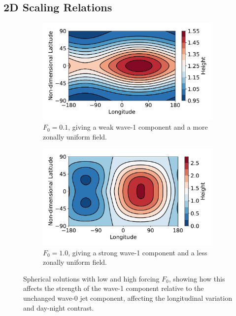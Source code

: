 \subsection{2D Scaling Relations}\label{sec:2d-scaling}


\begin{figure}
  \centering
  \begin{subfigure}[t]{0.48\textwidth}
    \includegraphics[width=\textwidth]{figures/wave-mean-flow/spherical-low-F.pdf}
    \caption{$F_{0} = 0.1$, giving a weak wave-1 component and  a more zonally uniform field.}
    \label{fig:spherical-low-F}
  \end{subfigure}
  \quad
  \begin{subfigure}[t]{0.48\textwidth}
    \includegraphics[width=\textwidth]{figures/wave-mean-flow/spherical-high-F.pdf}
    \caption{$F_{0} = 1.0$, giving a strong wave-1 component and a less zonally uniform field.}
    \label{fig:spherical-high-F}
  \end{subfigure}
  \caption{Spherical solutions with low and high forcing $F_{0}$, showing how this affects the strength of the wave-1 component relative to the unchanged wave-0 jet component, affecting the longitudinal variation and day-night contrast.}
  \label{fig:spherical-F-effect}
\end{figure}

